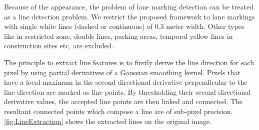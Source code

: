 Because of the appearance, the problem of lane marking detection can be treated as a line detection problem. We restrict the proposed framework to lane markings with single white lines (dashed or continuous) of 0.3 meter width. Other types like in restricted zone, double lines, parking areas, temporal yellow lines in construction sites etc, are excluded. %

The principle to extract line features is to firstly derive the line direction for each pixel by using partial derivatives of a Gaussian smoothing kernel. Pixels that have a local maximum in the second directional derivative perpendicular to the line direction are marked as line points. By thresholding their second directional derivative values, the accepted line points are then linked and connected.
The resultant connected points which compose a line are of sub-pixel precision. \cref{fig:LineExtraction} shows the extracted lines on the original image.

